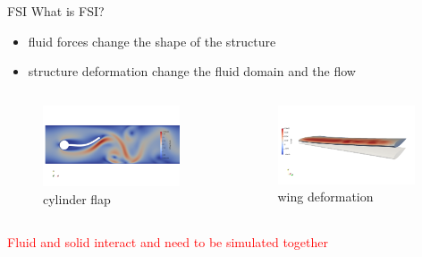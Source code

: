 \documentclass[10pt,t]{beamer}
\begin{document}
\begin{frame}{FSI}
What is FSI?

    \begin{itemize}
        \item fluid forces change the shape of the structure
        
        \pause
        
        \item structure deformation change the fluid domain and the flow
    \end{itemize}
    
    \pause

    \begin{columns}
        \begin{figure}
            \centering
            \includegraphics[width=0.95\textwidth,trim=0 100 0 100,clip]{images/flap1.png}
            \caption{cylinder flap}
        \end{figure}
        \begin{figure}
            \centering
            \includegraphics[width=0.95\textwidth,trim=0 100 0 100,clip]{images/naca.png}
            \caption{wing deformation}
        \end{figure}
    \end{columns}
    
    \pause
    
    
    \vskip 5mm
    
   \textcolor{red}{Fluid and solid interact and need to be simulated together}
    
    
\end{frame}
\end{document}
